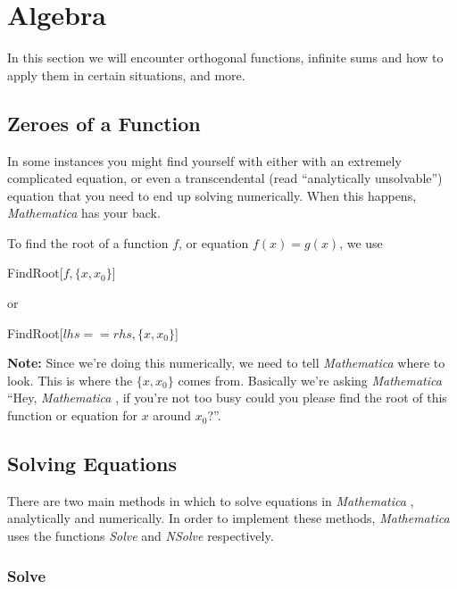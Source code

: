 \documentclass[11pt,letterpaper,twoside,titlepage]{book}
\newcommand{\Mathematica}{\textit{Mathematica} }
\begin{document}
		\chapter{Algebra}
		
			In this section we will encounter orthogonal functions, infinite sums and how to apply them in certain situations, and more.
			
			\section{Zeroes of a Function}
			
				In some instances you might find yourself with either with an extremely complicated equation, or even a transcendental (read ``analytically unsolvable'') equation that you need to end up solving numerically.  When this happens, \Mathematica has your back.  
				
				To find the root of a function $f$, or equation $f(x) = g(x)$, we use
				
				\begin{center}
				
					FindRoot[$f,\{x,x_0\}$]
				
				\end{center}
				
				or
				
				\begin{center}
				
					FindRoot[$lhs == rhs, \{x,x_0\}$]
				
				\end{center}
				
				\textbf{Note:} Since we're doing this numerically, we need to tell \Mathematica where to look.  This is where the $\{x,x_0\}$ comes from.  Basically we're asking \Mathematica ``Hey, \Mathematica, if you're not too busy could you please find the root of this function or equation for $x$ around $x_0$?''.
				
			\section{Solving Equations}
			
				There are two main methods in which to solve equations in \Mathematica, analytically and numerically.  In order to implement these methods, \Mathematica uses the functions \emph{Solve} and \emph{NSolve} respectively.
				
				\subsection{Solve}
				
\end{document}
